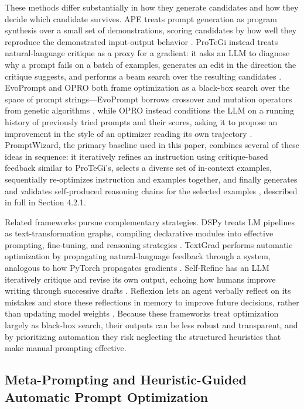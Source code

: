 \documentclass[a4paper,fleqn]{cas-sc}
\begin{document}
These methods differ substantially in how they generate candidates and how they decide which candidate survives. APE treats prompt generation as program synthesis over a small set of demonstrations, scoring candidates by how well they reproduce the demonstrated input-output behavior \citep{zhou2023}. ProTeGi instead treats natural-language critique as a proxy for a gradient: it asks an LLM to diagnose why a prompt fails on a batch of examples, generates an edit in the direction the critique suggests, and performs a beam search over the resulting candidates \citep{pryzant2023}. EvoPrompt and OPRO both frame optimization as a black-box search over the space of prompt strings---EvoPrompt borrows crossover and mutation operators from genetic algorithms \citep{guo2024}, while OPRO instead conditions the LLM on a running history of previously tried prompts and their scores, asking it to propose an improvement in the style of an optimizer reading its own trajectory \citep{yang2024}. PromptWizard, the primary baseline used in this paper, combines several of these ideas in sequence: it iteratively refines an instruction using critique-based feedback similar to ProTeGi's, selects a diverse set of in-context examples, sequentially re-optimizes instruction and examples together, and finally generates and validates self-produced reasoning chains for the selected examples \citep{agarwal2025}, described in full in Section 4.2.1.

Related frameworks pursue complementary strategies. DSPy treats LM pipelines as text-transformation graphs, compiling declarative modules into effective prompting, fine-tuning, and reasoning strategies \citep{khattab2024}. TextGrad performs automatic optimization by propagating natural-language feedback through a system, analogous to how PyTorch propagates gradients \citep{yuksekgonul2025}. Self-Refine has an LLM iteratively critique and revise its own output, echoing how humans improve writing through successive drafts \citep{madaan2023}. Reflexion lets an agent verbally reflect on its mistakes and store these reflections in memory to improve future decisions, rather than updating model weights \citep{shinn2023}. Because these frameworks treat optimization largely as black-box search, their outputs can be less robust and transparent, and by prioritizing automation they risk neglecting the structured heuristics that make manual prompting effective.

\subsection{Meta-Prompting and Heuristic-Guided Automatic Prompt Optimization}
\end{document}
